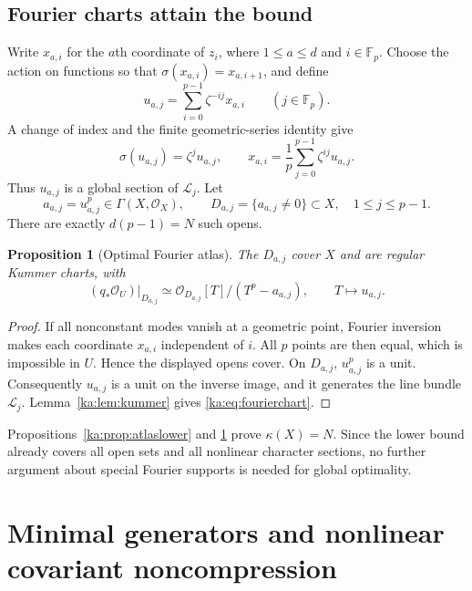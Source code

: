 \documentclass[11pt,a4paper]{article}
\newtheorem{proposition}[theorem]{Proposition}
\theoremstyle{definition}
\theoremstyle{remark}
\newcommand{\F}{\mathbb F}
\newcommand{\OO}{\mathcal O}
\newcommand{\LL}{\mathcal L}
\newcommand{\atlas}{\kappa}
\begin{document}
\subsection{Fourier charts attain the bound}
Write $x_{a,i}$ for the $a$th coordinate of $z_i$, where
$1\leq a\leq d$ and $i\in\F_p$. Choose the action on functions so that
$\sigma(x_{a,i})=x_{a,i+1}$, and define
\begin{equation}
 u_{a,j}=\sum_{i=0}^{p-1}\zeta^{-ij}x_{a,i}
 \qquad (j\in\F_p).
 \label{ka:eq:fourier}
\end{equation}
A change of index and the finite geometric-series identity give
\begin{equation}
 \sigma(u_{a,j})=\zeta^j u_{a,j},\qquad
 x_{a,i}=\frac1p\sum_{j=0}^{p-1}\zeta^{ij}u_{a,j}.
 \label{ka:eq:fourierinverse}
\end{equation}
Thus $u_{a,j}$ is a global section of $\LL_j$. Let
\[
 a_{a,j}=u_{a,j}^p\in\Gamma(X,\OO_X),\qquad
 D_{a,j}=\{a_{a,j}\neq0\}\subset X,
 \quad 1\leq j\leq p-1.
\]
There are exactly $d(p-1)=N$ such opens.

\begin{proposition}[Optimal Fourier atlas]
\label{ka:prop:fourieratlas}
The $D_{a,j}$ cover $X$ and are regular Kummer charts, with
\begin{equation}
 (q_*\OO_U)|_{D_{a,j}}
 \simeq\OO_{D_{a,j}}[T]/(T^p-a_{a,j}),
 \qquad T\longmapsto u_{a,j}.
 \label{ka:eq:fourierchart}
\end{equation}
\end{proposition}
\begin{proof}
If all nonconstant modes vanish at a geometric point, Fourier inversion
makes each coordinate $x_{a,i}$ independent of $i$. All $p$ points are
then equal, which is impossible in $U$. Hence the displayed opens cover.
On $D_{a,j}$, $u_{a,j}^p$ is a unit. Consequently $u_{a,j}$ is a unit
on the inverse image, and it generates the line bundle $\LL_j$.
Lemma~\ref{ka:lem:kummer} gives \eqref{ka:eq:fourierchart}.
\end{proof}

Propositions~\ref{ka:prop:atlaslower} and \ref{ka:prop:fourieratlas} prove
$\atlas(X)=N$. Since the lower bound already covers all open sets and
all nonlinear character sections, no further argument about special
Fourier supports is needed for global optimality.

\section{Minimal generators and nonlinear covariant noncompression}
\label{ka:sec:generators}
\end{document}
